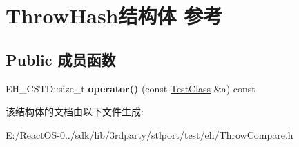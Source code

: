\hypertarget{struct_throw_hash}{}\section{Throw\+Hash结构体 参考}
\label{struct_throw_hash}
\subsection*{Public 成员函数}
\begin{DoxyCompactItemize}
\item 
\mbox{\label{struct_throw_hash_a1e8c6da7edc444bd841b37d352c7877f}} 
E\+H\+\_\+\+C\+S\+T\+D\+::size\+\_\+t {\bfseries operator()} (const \hyperlink{class_test_class}{Test\+Class} \&a) const
\end{DoxyCompactItemize}


该结构体的文档由以下文件生成\+:\begin{DoxyCompactItemize}
\item 
E\+:/\+React\+O\+S-\/0../sdk/lib/3rdparty/stlport/test/eh/Throw\+Compare.\+h\end{DoxyCompactItemize}

